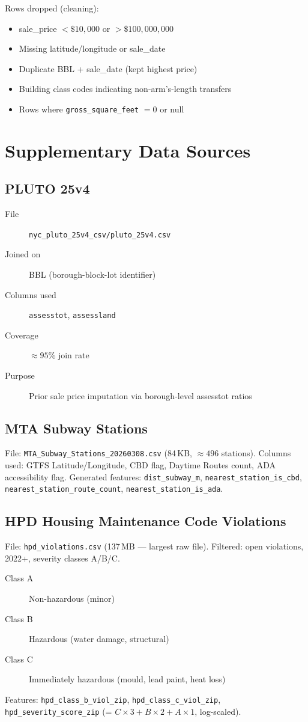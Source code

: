 \documentclass[11pt, a4paper, twoside]{report}
\begin{document}
Rows dropped (cleaning):
\begin{itemize}
  \item sale\_price $< \$10{,}000$ or $> \$100{,}000{,}000$
  \item Missing latitude/longitude or sale\_date
  \item Duplicate BBL + sale\_date (kept highest price)
  \item Building class codes indicating non-arm's-length transfers
  \item Rows where \texttt{gross\_square\_feet} $= 0$ or null
\end{itemize}

\section{Supplementary Data Sources}

\subsection*{PLUTO 25v4}
\begin{description}
  \item[File] \texttt{nyc\_pluto\_25v4\_csv/pluto\_25v4.csv}
  \item[Joined on] BBL (borough-block-lot identifier)
  \item[Columns used] \texttt{assesstot}, \texttt{assessland}
  \item[Coverage] $\approx 95\%$ join rate
  \item[Purpose] Prior sale price imputation via borough-level assesstot ratios
\end{description}

\subsection*{MTA Subway Stations}
File: \texttt{MTA\_Subway\_Stations\_20260308.csv} (84\,KB, $\approx 496$ stations).
Columns used: GTFS Latitude/Longitude, CBD flag, Daytime Routes count, ADA
accessibility flag.
Generated features: \texttt{dist\_subway\_m}, \texttt{nearest\_station\_is\_cbd},
\texttt{nearest\_station\_route\_count}, \texttt{nearest\_station\_is\_ada}.

\subsection*{HPD Housing Maintenance Code Violations}
File: \texttt{hpd\_violations.csv} (137\,MB --- largest raw file).
Filtered: open violations, 2022+, severity classes A/B/C.
\begin{description}
  \item[Class A] Non-hazardous (minor)
  \item[Class B] Hazardous (water damage, structural)
  \item[Class C] Immediately hazardous (mould, lead paint, heat loss)
\end{description}
Features: \texttt{hpd\_class\_b\_viol\_zip}, \texttt{hpd\_class\_c\_viol\_zip},
\texttt{hpd\_severity\_score\_zip} (= $C \times 3 + B \times 2 + A \times 1$,
log-scaled).
\end{document}
